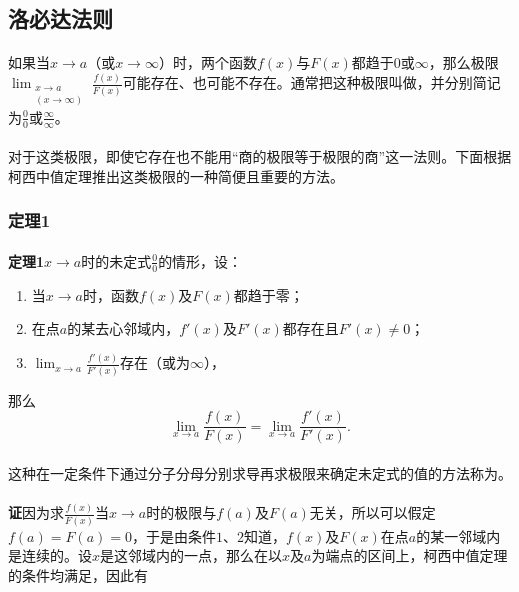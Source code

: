 \subsection{洛必达法则}
\paragraph{}
如果当$x \to a$（或$x\to \infty$）时，两个函数$f(x)$与$F(x)$都趋于$0$或$\infty$，那么极限$\displaystyle \lim_{\substack{x \to a \\ (x \to \infty)}} \frac{f(x)}{F(x)}$可能存在、也可能不存在。通常把这种极限叫做，并分别简记为$\frac{0}{0}$或$\frac{\infty}{\infty}$。

\paragraph{}
对于这类极限，即使它存在也不能用“商的极限等于极限的商”这一法则。下面根据柯西中值定理推出这类极限的一种简便且重要的方法。

\subsubsection{定理1}
\paragraph{}
\textbf{定理1\;}$x \to a$时的未定式$\frac{0}{0}$的情形，设：
\begin{enumerate}
  \item 当$x \to a$时，函数$f(x)$及$F(x)$都趋于零；
  \item 在点$a$的某去心邻域内，$f'(x)$及$F'(x)$都存在且$F'(x) \neq 0$；
  \item $\displaystyle \lim_{x \to a}\frac{f'(x)}{F'(x)}$存在（或为$\infty$），
\end{enumerate}
那么
\begin{equation}
  \lim_{x \to a}\frac{f(x)}{F(x)} = \lim_{x \to a} \frac{f'(x)}{F'(x)}.
\end{equation}

\paragraph{}
这种在一定条件下通过分子分母分别求导再求极限来确定未定式的值的方法称为。

\paragraph{}
\textbf{证\;}因为求$\frac{f(x)}{F(x)}$当$x\to a$时的极限与$f(a)$及$F(a)$无关，所以可以假定$f(a) = F(a) = 0$，于是由条件$1$、$2$知道，$f(x)$及$F(x)$在点$a$的某一邻域内是连续的。设$x$是这邻域内的一点，那么在以$x$及$a$为端点的区间上，柯西中值定理的条件均满足，因此有

